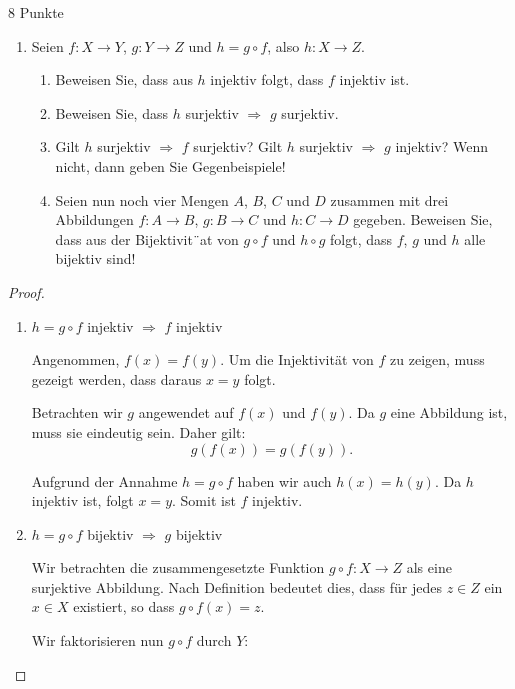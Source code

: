 \documentclass{problemset}
\begin{document}
\pagebreak

\begin{problem}{8 Punkte}
\begin{enumerate}
	\item Seien $f: X \to Y$, $g: Y \to Z$ und $h = g \circ f$, also $h: X \to Z$.
	      \begin{enumerate}
		      \item Beweisen Sie, dass aus $h$ injektiv folgt, dass $f$ injektiv ist.
		      \item Beweisen Sie, dass $h$ surjektiv $\Rightarrow$ $g$ surjektiv.
		      \item Gilt $h$ surjektiv $\Rightarrow$ $f$ surjektiv? Gilt $h$ surjektiv $\Rightarrow$ $g$ injektiv? Wenn nicht, dann geben Sie Gegenbeispiele!
		      \item Seien nun noch vier Mengen $A$, $B$, $C$ und $D$ zusammen mit drei Abbildungen $f: A \to B$, $g: B \to C$ und $h: C \to D$ gegeben. Beweisen Sie, dass aus der Bijektivit¨at von $g \circ f$ und $h \circ g$ folgt, dass $f$, $g$ und $h$ alle bijektiv sind!
	      \end{enumerate}

\end{enumerate}

\begin{proof} $ $
	\begin{enumerate}
		\item $h = g \circ f$ injektiv $\Rightarrow$ $f$ injektiv

		      Angenommen, $f(x) = f(y)$. Um die Injektivität von $f$ zu zeigen, muss gezeigt werden, dass daraus $x = y$ folgt.

		      Betrachten wir $g$ angewendet auf $f(x)$ und $f(y)$. Da $g$ eine Abbildung ist, muss sie eindeutig sein. Daher gilt:
		      \[
			      g(f(x)) = g(f(y)).
		      \]

		      Aufgrund der Annahme $h = g \circ f$ haben wir auch $h(x) = h(y)$.
		      Da $h$ injektiv ist, folgt $x = y$. Somit ist $f$ injektiv. \checkmark
		\item $h = g \circ f$ bijektiv $\Rightarrow$ $g$ bijektiv

		      Wir betrachten die zusammengesetzte Funktion \(g \circ f: X \to Z\) als eine surjektive Abbildung. Nach Definition bedeutet dies, dass für jedes \(z \in Z\) ein \(x \in X\) existiert, so dass \(g \circ f(x) = z\).

		      Wir faktorisieren nun \(g \circ f\) durch \(Y\):


\end{enumerate}
\end{proof}
\end{problem}
\end{document}
